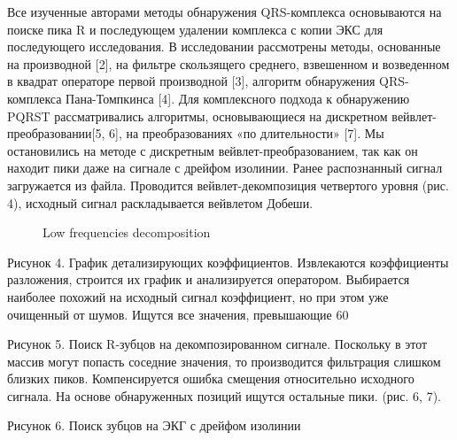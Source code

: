\documentclass[runningheads]{AIIT}
\begin{document}
Все изученные авторами методы обнаружения QRS-комплекса основываются на поиске пика R и последующем удалении комплекса с копии ЭКС для последующего исследования. В исследовании рассмотрены методы, основанные на производной [2], на фильтре скользящего среднего, взвешенном и возведенном в квадрат операторе первой производной [3], алгоритм обнаружения QRS-комплекса Пана-Томпкинса [4]. Для комплексного подхода к обнаружению PQRST рассматривались алгоритмы, основывающиеся на дискретном вейвлет-преобразовании[5, 6], на преобразованиях «по длительности» [7].
Мы остановились на методе с дискретным вейвлет-преобразованием, так как он находит пики даже на сигнале с дрейфом изолинии.
Ранее распознанный сигнал загружается из файла. Проводится вейвлет-декомпозиция четвертого уровня (рис. 4), исходный сигнал раскладывается вейвлетом Добеши.


\begin{figure}[htb]
  \centering

  \caption{Low frequencies decomposition}
  \label{fig:decomp}
\end{figure}

Рисунок 4. График детализирующих коэффициентов.
Извлекаются коэффициенты разложения, строится их график и анализируется оператором. Выбирается наиболее похожий на исходный сигнал коэффициент, но при этом уже очищенный от шумов. Ищутся все значения, превышающие 60%

Рисунок 5. Поиск R-зубцов на декомпозированном сигнале.
Поскольку в этот массив могут попасть соседние значения, то производится фильтрация слишком близких пиков. Компенсируется ошибка смещения относительно исходного сигнала. На основе обнаруженных позиций ищутся остальные пики. (рис. 6, 7).

Рисунок 6. Поиск зубцов на ЭКГ с дрейфом изолинии
\end{document}
